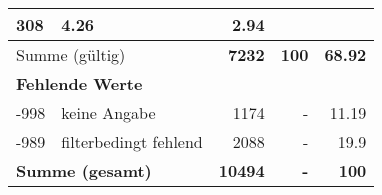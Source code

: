 \begin{longtable}{lXrrr}
       \num{308} &
       \num[round-mode=places,round-precision=2]{4,26} &
         \num[round-mode=places,round-precision=2]{2,94} \\
     \midrule
     \multicolumn{2}{l}{Summe (gültig)} &
       \textbf{\num{7232}} &
     \textbf{100} &
       \textbf{\num[round-mode=places,round-precision=2]{68,92}} \\
     \multicolumn{5}{l}{\textbf{Fehlende Werte}}\\
       -998 &
       keine Angabe &
         \num{1174} &
        - &
         \num[round-mode=places,round-precision=2]{11,19} \\
       -989 &
       filterbedingt fehlend &
         \num{2088} &
        - &
         \num[round-mode=places,round-precision=2]{19,9} \\
     \midrule
     \multicolumn{2}{l}{\textbf{Summe (gesamt)}} &
          \textbf{\num{10494}} &
        \textbf{-} &
        \textbf{100} \\
     \bottomrule
     \end{longtable}
     
